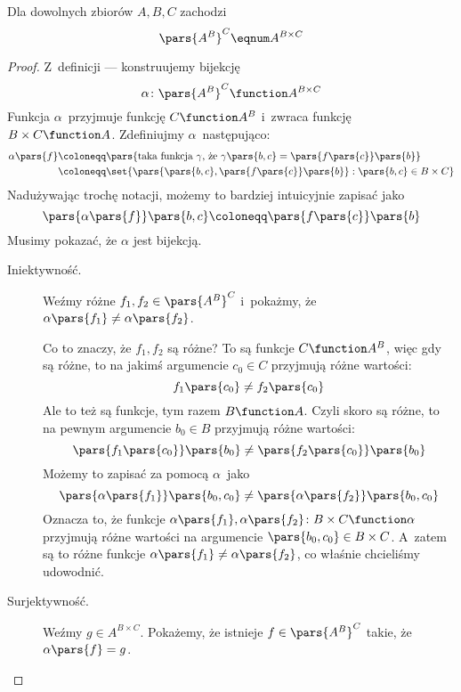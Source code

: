 \begin{theorem}
Dla dowolnych zbiorów \(A, B, C\) zachodzi
\begin{equation*}
    \pars{A^B}^C \eqnum A^{B \times C}
\end{equation*}
\end{theorem}
\begin{proof}
Z~definicji --- konstruujemy bijekcję
\begin{equation*}
    \alpha\colon \pars{A^B}^C \function A^{B \times C}
\end{equation*}
Funkcja \(\alpha\)~przyjmuje funkcję \(C \function A^B\) i~zwraca funkcję \(B \times C \function A\). Zdefiniujmy \(\alpha\)~następująco:
\begin{equation*}
    \begin{split}
        \alpha\pars{f}
            &\coloneqq \pars{\text{taka funkcja \(\gamma\), że \(\gamma\pars{b, c} = \pars{f\pars{c}}\pars{b}\)}}\\
            &\coloneqq \set{\pars{\pars{b, c}, \pars{f\pars{c}}\pars{b}} : \pars{b, c} \in B \times C}
    \end{split}
\end{equation*}
Nadużywając trochę notacji, możemy to bardziej intuicyjnie zapisać jako
\begin{equation*}
    \pars{\alpha\pars{f}}\pars{b, c} \coloneqq \pars{f\pars{c}}\pars{b}
\end{equation*}
Musimy pokazać, że \(\alpha\) jest bijekcją.
\begin{description}
    \item[Iniektywność.] Weźmy różne \(f_1, f_2 \in \pars{A^B}^C\) i~pokażmy, że \(\alpha\pars{f_1} \neq \alpha\pars{f_2}\).

        Co to znaczy, że \(f_1, f_2\) są różne? To są funkcje \(C \function A^B\), więc gdy są różne, to na jakimś argumencie \(c_0 \in C\) przyjmują różne wartości:
        \begin{equation*}
            f_1\pars{c_0} \neq f_2\pars{c_0}
        \end{equation*}
        Ale to też są funkcje, tym razem \(B \function A\). Czyli skoro są różne, to na pewnym argumencie \(b_0 \in B\) przyjmują różne wartości:
        \begin{equation*}
            \pars{f_1\pars{c_0}}\pars{b_0} \neq \pars{f_2\pars{c_0}}\pars{b_0}
        \end{equation*}
        Możemy to zapisać za pomocą \(\alpha\)~jako
        \begin{equation*}
            \pars{\alpha\pars{f_1}}\pars{b_0, c_0} \neq \pars{\alpha\pars{f_2}}\pars{b_0, c_0}
        \end{equation*}
        Oznacza to, że funkcje \(\alpha\pars{f_1}, \alpha\pars{f_2}\colon B \times C \function \alpha\) przyjmują różne wartości na argumencie \(\pars{b_0, c_0} \in B \times C\). A~zatem są to różne funkcje \(\alpha\pars{f_1} \neq \alpha\pars{f_2}\), co właśnie chcieliśmy udowodnić.
    \item[Surjektywność.] Weźmy \(g \in A^{B \times C}\). Pokażemy, że istnieje \(f \in \pars{A^B}^C\) takie, że \( \alpha\pars{f} = g \).
    

\end{description}
\end{proof}
